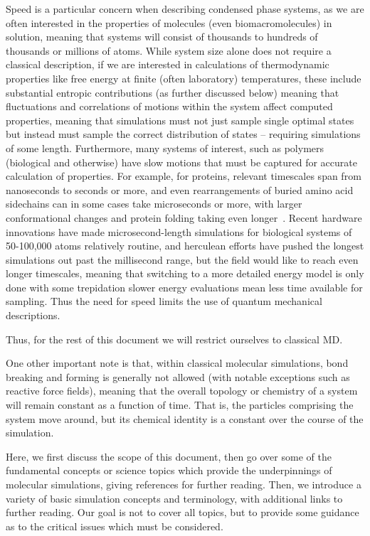 \documentclass[9pt,bestpractices]{livecoms}
\begin{document}
Speed is a particular concern when describing condensed phase systems, as we are often interested in the properties of molecules (even biomacromolecules) in solution, meaning that systems will consist of thousands to hundreds of thousands or millions of atoms.
While system size alone does not require a classical description, if we are interested in calculations of thermodynamic properties like free energy at finite (often laboratory) temperatures, these include substantial entropic contributions (as further discussed below) meaning that fluctuations and correlations of motions within the system affect computed properties, meaning that simulations must not just sample single optimal states but instead must sample the correct distribution of states -- requiring simulations of some length.
Furthermore, many systems of interest, such as polymers (biological and otherwise) have slow motions that must be captured for accurate calculation of properties.
For example, for proteins, relevant timescales span from nanoseconds to seconds or more, and even rearrangements of buried amino acid sidechains can in some cases take microseconds or more, with larger conformational changes and protein folding taking even longer~\cite{Schlick:2010:, Mobley:2012:JComputAidedMolDes}. 
Recent hardware innovations have made microsecond-length simulations for biological systems of 50-100,000 atoms relatively routine, and herculean efforts have pushed the longest simulations out past the millisecond range, but the field would like to reach even longer timescales, meaning that switching to a more detailed energy model is only done with some trepidation slower energy evaluations mean less time available for sampling. 
Thus the need for speed limits the use of quantum mechanical descriptions.

Thus, for the rest of this document we will restrict ourselves to classical MD.

One other important note is that, within classical molecular simulations, bond breaking and forming is generally not allowed (with notable exceptions such as reactive force fields),  meaning that the overall topology or chemistry of a system will remain constant as a function of time.
That is, the particles comprising the system move around, but its chemical identity is a constant over the course of the simulation.

Here, we first discuss the scope of this document, then go over some of the fundamental concepts or science topics which provide the underpinnings of molecular simulations, giving references for further reading.
Then, we introduce a variety of basic simulation concepts and terminology, with additional links to further reading.
Our goal is not to cover all topics, but to provide some guidance as to the critical issues which must be considered.
\end{document}

